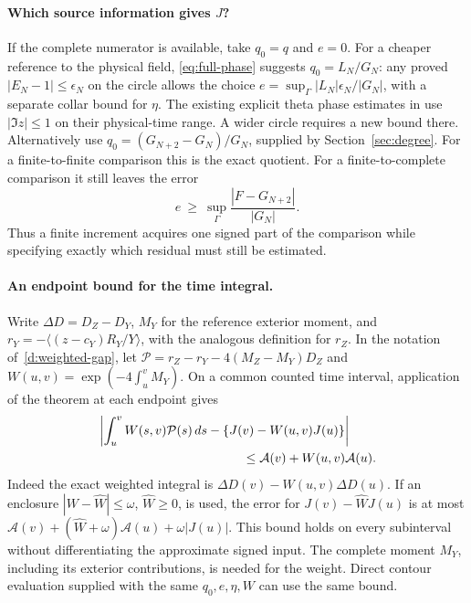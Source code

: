 \paragraph{Which source information gives \(J\)?}
If the complete numerator is available, take \(q_0=q\) and \(e=0\). For a cheaper reference to the physical field, \eqref{eq:full-phase} suggests \(q_0=L_N/G_N\): any proved \(|E_N-1|\le\epsilon_N\) on the circle allows the choice \(e=\sup_\Gamma |L_N|\epsilon_N/|G_N|\), with a separate collar bound for \(\eta\). The existing explicit theta phase estimates in \cite{vcd} use \(|\Im z|\le1\) on their physical-time range. A wider circle requires a new bound there. Alternatively use \(q_0=(G_{N+2}-G_N)/G_N\), supplied by Section~\ref{sec:degree}. For a finite-to-finite comparison this is the exact quotient. For a finite-to-complete comparison it still leaves the error
\begin{equation}
 e\ \ge\ \sup_{\Gamma}\frac{|F-G_{N+2}|}{|G_N|}.
 \label{eq:remaining}
\end{equation}
Thus a finite increment acquires one signed part of the comparison while specifying exactly which residual must still be estimated.

\paragraph{An endpoint bound for the time integral.}
Write \(\Delta D=D_Z-D_Y\), \(M_Y\) for the reference exterior moment, and \(r_Y=-\langle(z-c_Y)R_Y/Y\rangle\), with the analogous definition for \(r_Z\). In the notation of~\eqref{d:weighted-gap}, let
\(\mathcal P=r_Z-r_Y-4(M_Z-M_Y)D_Z\) and \(W(u,v)=\exp(-4\int_u^v M_Y)\).
On a common counted time interval, application of the theorem at each endpoint gives
\begin{align}
 &\left|\int_u^v W(s,v)\mathcal P(s)\,ds-
             \{J(v)-W(u,v)J(u)\}\right| \notag\\
 &\hspace{40mm}\le \mathcal A(v)+W(u,v)\mathcal A(u).
 \label{eq:endpoint}
\end{align}
Indeed the exact weighted integral is \(\Delta D(v)-W(u,v)\Delta D(u)\). If an enclosure \(|W-\widehat W|\le\omega\), \(\widehat W\ge0\), is used, the error for \(J(v)-\widehat WJ(u)\) is at most
\(\mathcal A(v)+(\widehat W+\omega)\mathcal A(u)+\omega|J(u)|\).
This bound holds on every subinterval without differentiating the approximate signed input. The complete moment \(M_Y\), including its exterior contributions, is needed for the weight. Direct contour evaluation supplied with the same \(q_0,e,\eta,W\) can use the same bound.

